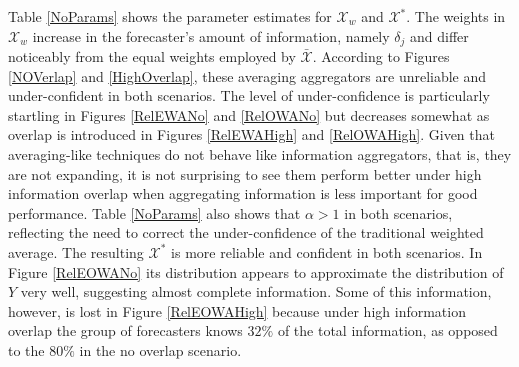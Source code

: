 \documentclass[11pt]{article}
\theoremstyle{definition}
\theoremstyle{definition}
\begin{document}
Table \ref{NoParams} shows the parameter estimates for $\mathcal{X}_w$ and $\mathcal{X}^*$. The weights in $\mathcal{X}_w$ increase in the forecaster's amount of information, namely $\delta_j$ and differ noticeably from the equal weights employed by $\bar{\mathcal{X}}$. According to Figures \ref{NOVerlap} and  \ref{HighOverlap}, these averaging aggregators are unreliable and under-confident in both scenarios. 
The level of under-confidence is particularly startling in Figures \ref{RelEWANo} and \ref{RelOWANo} but decreases somewhat as overlap is introduced in Figures \ref{RelEWAHigh} and \ref{RelOWAHigh}. Given that averaging-like techniques do not behave like information aggregators, that is, they are not expanding, it is not surprising to see them perform better under high information overlap when aggregating information is less important for good performance. Table \ref{NoParams} also shows that 
 $\alpha > 1$ in both scenarios, reflecting the need to correct the under-confidence of the traditional weighted average. 
The resulting $\mathcal{X}^*$ is more reliable and confident in both scenarios.  In Figure \ref{RelEOWANo} its distribution appears to approximate the distribution of $Y$ very well, suggesting  almost complete information. Some of this information, however, is lost in Figure \ref{RelEOWAHigh} because under high information overlap the group of forecasters knows $32\%$ of the total information, as opposed to the $80\%$ in the no overlap scenario.
\end{document}
